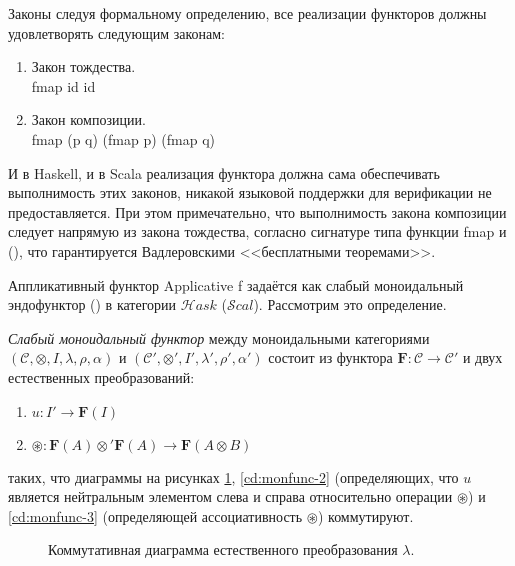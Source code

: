 Законы следуя формальному определению, все реализации функторов должны удовлетворять следующим законам:
\begin{enumerate}
  \item Закон тождества.\\ \<fmap id \equiv id\>
  \item Закон композиции.\\ \<fmap (p \circ q) \equiv (fmap p) \circ (fmap q)\>
\end{enumerate}

И в Haskell, и в Scala реализация функтора должна сама обеспечивать выполнимость этих законов, никакой языковой поддержки для верификации не предоставляется. При этом примечательно, что выполнимость закона композиции следует напрямую из закона тождества, согласно сигнатуре типа функции \<fmap\> и \<(\circ)\>, что гарантируется Вадлеровскими <<бесплатными теоремами>>\cite{Wadler1989a}.

Аппликативный функтор \<Applicative f\> задаётся как слабый моноидальный эндофунктор () в категории $\mathcal{H}ask$ ($\mathcal{S}cal$). Рассмотрим это определение.

\begin{definition}
  \emph{Слабый моноидальный функтор} между моноидальными категориями $(\mathcal{C}, \otimes, I, \lambda, \rho, \alpha)$ и $(\mathcal{C'}, \otimes', I', \lambda', \rho', \alpha')$ состоит из функтора $\mathbf{F}: \mathcal{C} \to \mathcal{C'}$ и двух естественных преобразований:
  \begin{enumerate}
    \item $u : I' \to \mathbf{F}(I)$
    \item $\circledast : \mathbf{F}(A) \otimes' \mathbf{F}(A) \to \mathbf{F}(A \otimes B)$
  \end{enumerate}
  таких, что диаграммы на рисунках \ref{cd:monfunc-1}, \ref{cd:monfunc-2} (определяющих, что $u$ является нейтральным элементом слева и справа относительно операции $\circledast$) и \ref{cd:monfunc-3} (определяющей ассоциативность $\circledast$) коммутируют.
\end{definition}

\begin{figure}[h]
  \centering
    \caption{Коммутативная диаграмма естественного преобразования $\lambda$.}
    \label{cd:monfunc-1}
\end{figure}

